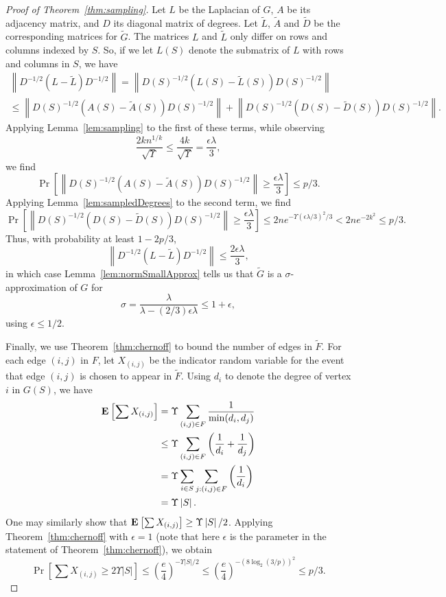 \documentclass[11pt]{article}
\def\Dtil{\widetilde{D}}
\def\Gtil{\widetilde{G}}
\def\Ftil{\widetilde{F}}
\def\Ltil{\widetilde{L}}
\def\Atil{\widetilde{A}}
\def\prob#1#2{\Pr_{#1}\left[ #2 \right]}
\def\expec#1#2{\mbox{\bf E}_{#1}\left[ #2 \right]}
\def\norm#1{\left\| #1 \right\|}
\def\sizeof#1{\left|#1  \right|}
\begin{document}
\begin{proof}[Proof of Theorem~\ref{thm:sampling}]
Let $L$ be the Laplacian of $G$, $A$ be its adjacency matrix, and $D$
  its diagonal matrix of degrees.
Let $\Ltil$, $\Atil$ and $\Dtil$ be the corresponding matrices for $\Gtil$.
The matrices $L$ and $\Ltil $ only differ on rows and columns indexed by $S$.
So, if we let $L (S)$ denote the submatrix of $L$ with rows and
  columns in $S$, we have
\begin{multline*}
  \norm{D^{-1/2} (L - \Ltil) D^{-1/2}}
=
  \norm{D (S)^{-1/2} (L (S) - \Ltil (S)) D (S)^{-1/2}}\\
\leq
  \norm{D (S)^{-1/2} (A (S) - \Atil (S)) D (S)^{-1/2}}
+
  \norm{D (S)^{-1/2} (D (S) - \Dtil (S)) D (S)^{-1/2}}.
\end{multline*}
Applying Lemma~\ref{lem:sampling} to the first of these terms,
  while observing
\[
  \frac{2 k n^{1/k}}{\sqrt{\Upsilon}}
\leq
  \frac{4 k }{\sqrt{\Upsilon}}
=
\frac{\epsilon \lambda}{3},
\]
  we find
\[
\prob{}{\norm{D (S)^{-1/2} (A (S) - \Atil (S)) D (S)^{-1/2}}
  \geq \frac{\epsilon \lambda}{3}} \leq p/3.
\]
Applying Lemma~\ref{lem:sampledDegrees} to the second term,
  we find
\[
\prob{}{\norm{D (S)^{-1/2} (D (S) - \Dtil (S)) D (S)^{-1/2}}
  \geq \frac{\epsilon \lambda}{3}}
 \leq
2 n e^{-\Upsilon \left(\epsilon \lambda /3 \right)^{2} / 3}
<
2 n e^{-2 k^{2}}
\leq
p/3.
\]
Thus, with probability at least $1-2p/3$,
\[
  \norm{D^{-1/2} (L - \Ltil) D^{-1/2}} \leq \frac{2 \epsilon \lambda}{3},
\]
in which case Lemma~\ref{lem:normSmallApprox} tells us that
  $\Gtil$ is a $\sigma$-approximation of $G$
  for
\[
  \sigma = \frac{\lambda}{\lambda - (2/3) \epsilon \lambda }
  \leq
  1+\epsilon,
\]
using
  $\epsilon \leq 1/2$.

Finally, we use Theorem~\ref{thm:chernoff} to bound the number of edges in $\Ftil$.
For each edge $(i,j)$ in $F$, let $X_{(i,j)}$ be the indicator random variable for
  the event that edge $(i,j)$ is chosen to appear in $\Ftil$.
Using $d_{i}$ to denote the degree of vertex $i$ in $G (S)$, we have
\begin{align*}
  \expec{}{\sum X_{(i,j)}}
& =
  \Upsilon \sum_{(i,j) \in F} \frac{1}{ \min (d_{i}, d_{j})}\\
& \leq
  \Upsilon \sum_{(i,j) \in F} \left(\frac{1}{d_{i}} + \frac{1}{d_{j}} \right)\\
& =
  \Upsilon \sum_{i \in S} \sum_{j : (i,j) \in F} \left(\frac{1}{d_{i}} \right)\\
& = \Upsilon \sizeof{S}.
\end{align*}
One may similarly show that $\expec{}{\sum X_{(i,j)}} \geq \Upsilon \sizeof{S} /2$.
Applying Theorem~\ref{thm:chernoff} with $\epsilon = 1$ (note that here $\epsilon$ is the
parameter in the statement of Theorem~\ref{thm:chernoff}), we obtain
\[
  \prob{}{\sum X_{(i,j)} \geq 2 \Upsilon \sizeof{S}}
\leq
\left(\frac{e}{4} \right)^{- \Upsilon \sizeof{S} / 2}
\leq
\left(\frac{e}{4} \right)^{- (8 \log_{2} (3/p))^{2}}
\leq p/3.
\]


\end{proof}
\end{document}
